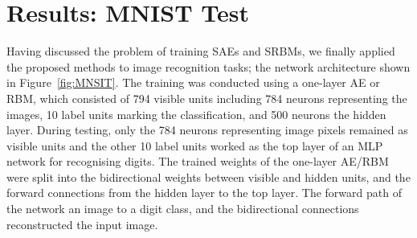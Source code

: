

\section{Results: MNIST Test}
\DIFaddbegin \label{sec:SRM_result}
\DIFaddend Having discussed the problem of training \DIFdelbegin {}\DIFdelend SAEs and SRBMs, we finally applied the proposed methods to \DIFaddbegin {}\DIFaddend image recognition tasks\DIFdelbegin {}\DIFdelend ;
the network architecture \DIFdelbegin {}\DIFdelend \DIFaddbegin {}\DIFaddend shown in Figure~\ref{fig:MNSIT}.
The training was conducted using a one-layer AE or RBM, which consisted of 794 visible units including 784 neurons representing the images, 10 label units marking the classification, and 500 neurons \DIFdelbegin {}\DIFdelend \DIFaddbegin {}\DIFaddend the hidden layer.
During testing, only the 784 neurons representing image pixels remained as visible units and the other 10 label units worked as the top layer of an MLP network for recognising digits.
The trained weights of the one-layer AE/RBM were split into the bidirectional weights between visible and hidden units, and the forward connections from the hidden layer to the top layer.
The forward path of the network \DIFdelbegin {}\DIFdelend \DIFaddbegin {}\DIFaddend an image to a digit class, and the bidirectional connections reconstructed the input image.

